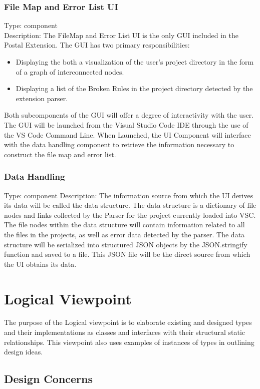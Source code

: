 \documentclass[letterpaper,10pt,titlepage,draftclsnofoot,onecolumn,onesided] {IEEEtran}
\begin{document}
		
	
	\subsubsection{File Map and Error List UI}
	Type: component
	\\
	Description: The FileMap and Error List UI is the only GUI included in the Postal Extension. 
	The GUI has two primary responsibilities: 
	\begin{itemize}
	\item Displaying the both a visualization of the user's project directory in the form of a graph of interconnected nodes.
	\item Displaying a list of the Broken Rules in the project directory detected by the extension parser.
	\end{itemize}
	Both subcomponents of the GUI will offer a degree of interactivity with the user. 
	The GUI will be launched from the Visual Studio Code IDE through the use of the VS Code Command Line.
	When Launched, the UI Component will interface with the data handling component to retrieve the information necessary to construct the file map and error list.

	
	\subsubsection{Data Handling} 
	Type: component
	Description: The information source from which the UI derives its data will be called the data structure. 
	The data structure is a dictionary of file nodes and links collected by the Parser for the project currently loaded into VSC. 
	The file nodes within the data structure will contain information related to all the files in the projects, as well as error data detected by the parser.
	The data structure will be serialized into structured JSON objects by the JSON.stringify function and saved to a file. 
	This JSON file will be the direct source from which the UI obtains its data.

	
	
\section{Logical Viewpoint}
The purpose of the Logical viewpoint is to elaborate existing and designed types and their implementations
as classes and interfaces with their structural static relationships. This viewpoint also uses examples of
instances of types in outlining design ideas. 
\subsection{Design Concerns}
\end{document}
